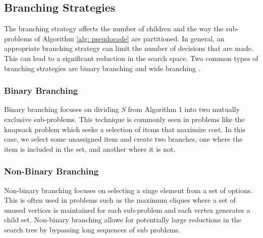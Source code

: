 \subsection{Branching Strategies}
	The branching strategy affects the number of children and the way the sub-problems of Algorithm \ref{alg: pseudocode} are partitioned. 
	In general, an appropriate branching strategy can limit the number of decisions that are made.
	This can lead to a significant reduction in the search space. 
	Two common types of branching strategies are binary branching and wide branching \cite{morrison2016branch}.
	
	\subsubsection{Binary Branching}
		Binary branching focuses on dividing $S$ from Algorithm 1 into two mutually exclusive sub-problems. This technique is commonly seen in problems like the knapsack problem which seeks a selection of items that maximize cost. In this case, we select some unassigned item and create two branches, one where the item is included in the set, and another where it is not. 
	
	\subsubsection{Non-Binary Branching}
		Non-binary branching focuses on selecting a singe element from a set of options. This is often used in problems such as the maximum cliques where a set of unused vertices is maintained for each sub-problem and each vertex generates a child set. Non-binary branching allows for potentially large reductions in the search tree by bypassing long sequences of sub problems. 